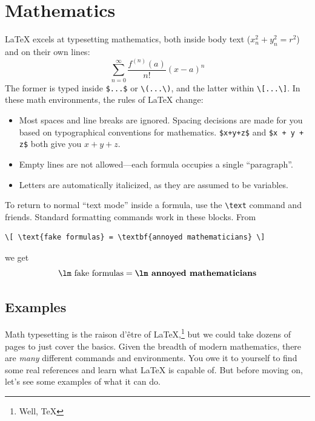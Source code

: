 \chapter{Mathematics}
\label{math}

\LaTeX{} excels at typesetting mathematics, both inside body text
($x_n^2+y_n^2=r^2$) and on their own lines:
\[\sum_{n=0}^{\infty} \frac{f^{(n)} (a)}{n!} (x - a)^n\]
The former is typed inside \verb|$...$| or \verb|\(...\)|,
and the latter within \verb|\[...\]|.
In these math environments, the rules of \LaTeX{} change:
\begin{itemize}
\item Most spaces and line breaks are ignored.
    Spacing decisions are made for you based on
    typographical conventions for mathematics.
    \verb|$x+y+z$| and \verb|$x + y + z$| both give you $x+y+z$.
\item Empty lines are not allowed---each formula occupies a single
    ``paragraph''\quotekern.
\item Letters are automatically italicized, as they are assumed to be variables.
\end{itemize}
To return to normal ``text mode'' inside a formula, use the \verb|\text| command
and friends.
Standard formatting commands work in these blocks.
From
\begin{leftfigure}
\begin{lstlisting}
\[ \text{fake formulas} = \textbf{annoyed mathematicians} \]
\end{lstlisting}
\end{leftfigure}
we get
\[ \text{\lm fake formulas} = \textbf{\lm annoyed mathematicians} \]

\section{Examples}

Math typesetting is the raison d'être of
\LaTeX,\punckern\footnote{Well, \TeX} but we could
take dozens of pages to just cover the basics.
Given the breadth of modern mathematics,
there are \emph{many} different commands and environments.
You owe it to yourself to find some real references and learn what \LaTeX{}
is capable of.
But before moving on, let's see some examples of what it can do.

